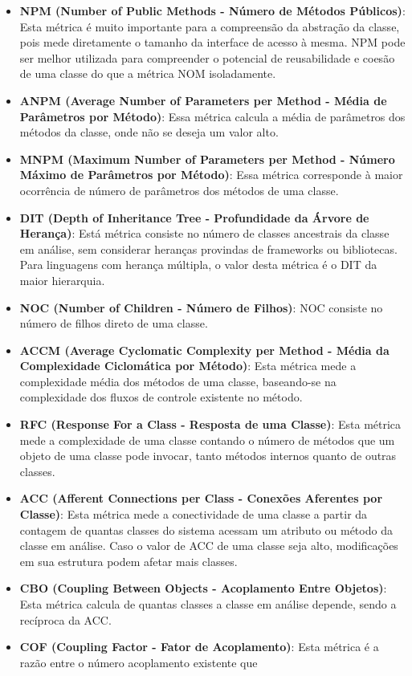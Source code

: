 \begin{itemize}
  \item \textbf{NPM (Number of Public Methods - Número de Métodos Públicos)}: Esta métrica é muito importante para a 
    compreensão da abstração da classe, pois mede diretamente o tamanho da interface de acesso à mesma. NPM pode ser melhor
    utilizada para compreender o potencial de reusabilidade e coesão de uma classe do que a métrica NOM isoladamente.
  \item \textbf{ANPM (Average Number of Parameters per Method - Média de Parâmetros por Método)}: Essa métrica calcula a 
    média de parâmetros dos métodos da classe, onde não se deseja um valor alto.
  \item \textbf{MNPM (Maximum Number of Parameters per Method - Número Máximo de Parâmetros por Método)}: Essa métrica 
    corresponde à maior ocorrência de número de parâmetros dos métodos de uma classe.
  \item \textbf{DIT (Depth of Inheritance Tree - Profundidade da Árvore de Herança)}: Está métrica consiste no número de 
    classes ancestrais da classe em análise, sem considerar heranças provindas de frameworks ou bibliotecas. Para linguagens 
    com herança múltipla, o valor desta métrica é o DIT da maior hierarquia.
  \item \textbf{NOC (Number of Children - Número de Filhos)}: NOC consiste no número de filhos direto de uma classe.
  \item \textbf{ACCM (Average Cyclomatic Complexity per Method - Média da Complexidade Ciclomática por Método)}: Esta métrica 
    mede a complexidade média dos métodos de uma classe, baseando-se na complexidade dos fluxos de controle existente no método.
  \item \textbf{RFC (Response For a Class - Resposta de uma Classe)}: Esta métrica mede a complexidade de uma classe contando 
    o número de métodos que um objeto de uma classe pode invocar, tanto métodos internos quanto de outras classes.
  \item \textbf{ACC (Afferent Connections per Class - Conexões Aferentes por Classe)}: Esta métrica mede a conectividade de 
    uma classe a partir da contagem de quantas classes do sistema acessam um atributo ou método da classe em análise. Caso o
    valor de ACC de uma classe seja alto, modificações em sua estrutura podem afetar mais classes.
  \item \textbf{CBO (Coupling Between Objects - Acoplamento Entre Objetos)}: Esta métrica calcula de quantas classes a classe 
    em análise depende, sendo a recíproca da ACC.
  \item \textbf{COF (Coupling Factor - Fator de Acoplamento)}: Esta métrica é a razão entre o número acoplamento existente que 

\end{itemize}
